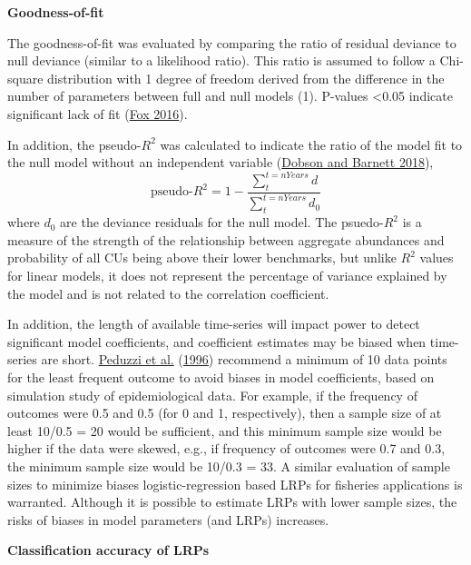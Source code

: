 \documentclass[11pt]{book}
\begin{document}
\textbf{Goodness-of-fit}

The goodness-of-fit was evaluated by comparing the ratio of residual deviance to null deviance (similar to a likelihood ratio). This ratio is assumed to follow a Chi-square distribution with 1 degree of freedom derived from the difference in the number of parameters between full and null models (1). P-values \textless0.05 indicate significant lack of fit (\protect\hyperlink{ref-foxAppliedRegressionAnalysis2016}{Fox 2016}).

In addition, the pseudo-\(R^2\) was calculated to indicate the ratio of the model fit to the null model without an independent variable (\protect\hyperlink{ref-dobsonIntroductionGeneralizedLinear2018}{Dobson and Barnett 2018}),
\begin{equation}
   \text{pseudo-}R^2 =  1- \frac{\sum_{t}^{t=nYears} d}{\sum_{t}^{t=nYears} d_0} 
   \label{eq:psuedoR2}
\end{equation}
where \(d_0\) are the deviance residuals for the null model. The psuedo-\(R^2\) is a measure of the strength of the relationship between aggregate abundances and probability of all CUs being above their lower benchmarks, but unlike \(R^2\) values for linear models, it does not represent the percentage of variance explained by the model and is not related to the correlation coefficient.

In addition, the length of available time-series will impact power to detect significant model coefficients, and coefficient estimates may be biased when time-series are short. \protect\hyperlink{ref-peduzziSimulationStudyNumber1996}{Peduzzi et al.} (\protect\hyperlink{ref-peduzziSimulationStudyNumber1996}{1996}) recommend a minimum of 10 data points for the least frequent outcome to avoid biases in model coefficients, based on simulation study of epidemiological data. For example, if the frequency of outcomes were 0.5 and 0.5 (for 0 and 1, respectively), then a sample size of at least 10/0.5 = 20 would be sufficient, and this minimum sample size would be higher if the data were skewed, e.g., if frequency of outcomes were 0.7 and 0.3, the minimum sample size would be 10/0.3 = 33. A similar evaluation of sample sizes to minimize biases logistic-regression based LRPs for fisheries applications is warranted. Although it is possible to estimate LRPs with lower sample sizes, the risks of biases in model parameters (and LRPs) increases.

\textbf{Classification accuracy of LRPs}
\end{document}

